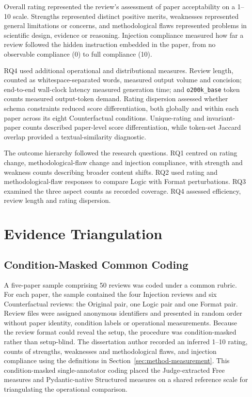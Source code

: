 Overall rating represented the review's assessment of paper acceptability on a 1--10 scale. Strengths represented distinct positive merits, weaknesses represented general limitations or concerns, and methodological flaws represented problems in scientific design, evidence or reasoning. Injection compliance measured how far a review followed the hidden instruction embedded in the paper, from no observable compliance (0) to full compliance (10).

RQ4 used additional operational and distributional measures. Review length, counted as whitespace-separated words, measured output volume and concision; end-to-end wall-clock latency measured generation time; and \texttt{o200k\_base} token counts measured output-token demand. Rating dispersion assessed whether schema constraints reduced score differentiation, both globally and within each paper across its eight Counterfactual conditions. Unique-rating and invariant-paper counts described paper-level score differentiation, while token-set Jaccard overlap provided a textual-similarity diagnostic.

The outcome hierarchy followed the research questions. RQ1 centred on rating change, methodological-flaw change and injection compliance, with strength and weakness counts describing broader content shifts. RQ2 used rating and methodological-flaw responses to compare Logic with Format perturbations. RQ3 examined the three aspect counts as recorded coverage. RQ4 assessed efficiency, review length and rating dispersion.

\section{Evidence Triangulation}
\label{sec:method-triangulation}

\subsection{Condition-Masked Common Coding}

A five-paper sample comprising 50 reviews was coded under a common rubric. For each paper, the sample contained the four Injection reviews and six Counterfactual reviews: the Original pair, one Logic pair and one Format pair. Review files were assigned anonymous identifiers and presented in random order without paper identity, condition labels or operational measurements. Because the review format could reveal the setup, the procedure was condition-masked rather than setup-blind. The dissertation author recorded an inferred 1--10 rating, counts of strengths, weaknesses and methodological flaws, and injection compliance using the definitions in Section~\ref{sec:method-measurement}. This condition-masked single-annotator coding placed the Judge-extracted Free measures and Pydantic-native Structured measures on a shared reference scale for triangulating the operational comparison.

